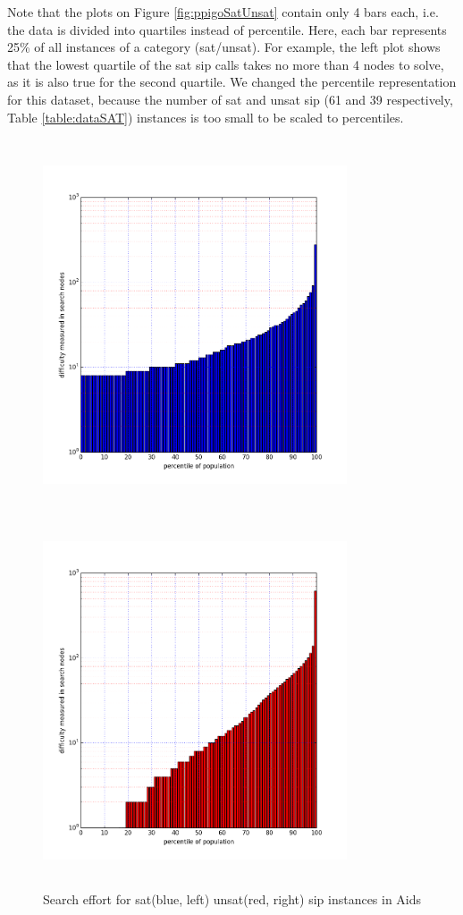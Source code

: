 \documentclass{l4proj}
\newcounter{example}[section]
\begin{document}
Note that the plots on Figure \ref{fig:ppigoSatUnsat} contain only 4 bars each, i.e. the data is divided into quartiles instead of percentile. Here, each bar represents 25\% of all instances of a category (\gls{sat}/\gls{unsat}). For example, the left plot shows that the lowest quartile of the \gls{sat} \gls{sip} calls takes no more than 4 nodes to solve, as it is also true for the second quartile. We changed the percentile representation for this dataset, because the number of \gls{sat} and \gls{unsat} \gls{sip} (61 and 39 respectively, Table \ref{table:dataSAT}) instances is too small to be scaled to percentiles.
\begin{figure}
\centering
\begin{minipage}[t]{.5\textwidth}
  \centering
  \includegraphics[height=11cm,width=9cm]{images/plots/aidsSAT.png}
\end{minipage}%
\begin{minipage}[t]{.5\textwidth}
  \centering
  \includegraphics[height=11cm,width=9cm]{images/plots/aidsUNSAT.png}
\end{minipage}
\caption{Search effort for \gls{sat}(blue, left) \gls{unsat}(red, right) \gls{sip} instances in Aids}
\label{fig:aidsSatUnsat}
\end{figure}
\end{document}
